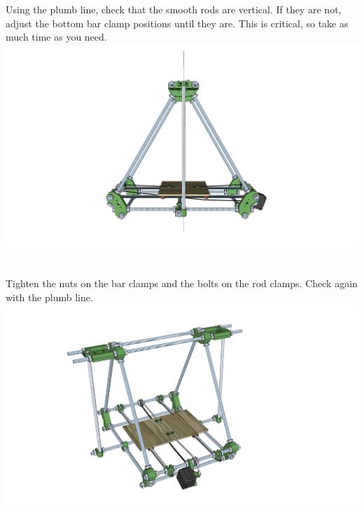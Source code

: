 \documentclass[twoside,a4paper,titlepage]{memoir}
\begin{document}
	\section{}
	Using the plumb line, check that the smooth rods are vertical. If they are not, adjust the bottom bar
	clamp positions until they are. This is critical, so take as much time as you need.\\
	\includegraphics[width=1\linewidth]{graphics/ch8_7.png}
	
	\section{}
	Tighten the nuts on the bar clamps and the bolts on the rod clamps. Check again with the plumb line.\\
	\includegraphics[width=1\linewidth]{graphics/ch8_8.png}
	
\end{document}
